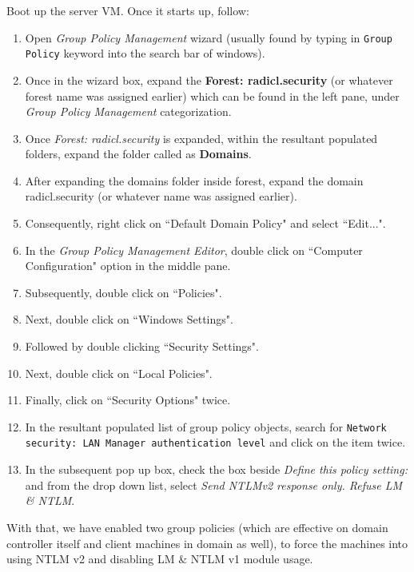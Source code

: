 \documentclass[12pt]{extarticle}
\begin{document}
\begin{enumerate}
	Boot up the server VM. Once it starts up, follow:
	
	\begin{enumerate}
		\item Open \textit{Group Policy Management} wizard (usually found by typing in \texttt{Group Policy} keyword into the search bar of windows).
		\item Once in the wizard box, expand the \textbf{Forest: radicl.security} (or whatever forest name was assigned earlier) which can be found in the left pane, under \textit{Group Policy Management} categorization.
		\item Once \textit{Forest: radicl.security} is expanded, within the resultant populated folders, expand the folder called as \textbf{Domains}.
		\item After expanding the domains folder inside forest, expand the domain radicl.security (or whatever name was assigned earlier).
		\item Consequently, right click on ``Default Domain Policy" and select ``Edit...".
		\item In the \textit{Group Policy Management Editor}, double click on ``Computer Configuration" option in the middle pane.
		\item Subsequently, double click on ``Policies".
		\item Next, double click on ``Windows Settings".
		\item Followed by double clicking ``Security Settings".
		\item Next, double click on ``Local Policies".
		\item Finally, click on ``Security Options" twice.
		\item In the resultant populated list of group policy objects, search for \texttt{Network security: LAN Manager authentication level} and click on the item twice.
		\item In the subsequent pop up box, check the box beside \textit{Define this policy setting:} and from the drop down list, select \textit{Send NTLMv2 response only. Refuse LM \& NTLM}. 
	\end{enumerate}
	
	With that, we have enabled two group policies (which are effective on domain controller itself and client machines in domain as well), to force the machines into using NTLM v2 and disabling LM \& NTLM v1 module usage.
	
\end{enumerate}


\end{document}
